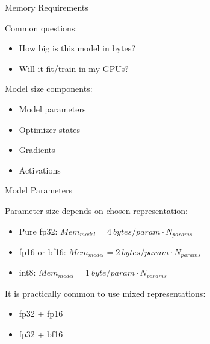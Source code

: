 
\begin{vbframe}{Memory Requirements}

\vfill

Common questions: \newline

\begin{itemize}
 	\item How big is this model in bytes?
	\item Will it fit/train in my GPUs?
\end{itemize}

\vskip8mm

Model size components: \newline

\begin{itemize}
 	\item Model parameters
	\item Optimizer states
	\item Gradients
	\item Activations
\end{itemize}

\vfill

\end{vbframe}


\begin{vbframe}{Model Parameters}

\vfill

Parameter size depends on chosen representation: \newline

\begin{itemize}
 	\item Pure fp32: $Mem_{model} = 4 ~bytes/param \cdot N_{params}$
 	\item fp16 or bf16: $Mem_{model} = 2 ~bytes/param \cdot N_{params}$
	\item int8: $Mem_{model} = 1 ~byte/param \cdot N_{params}$
\end{itemize}

\vskip8mm

It is practically common to use mixed representations: \newline

\begin{itemize}
 	\item fp32 + fp16
	\item fp32 + bf16
\end{itemize}

\vfill

\end{vbframe}

